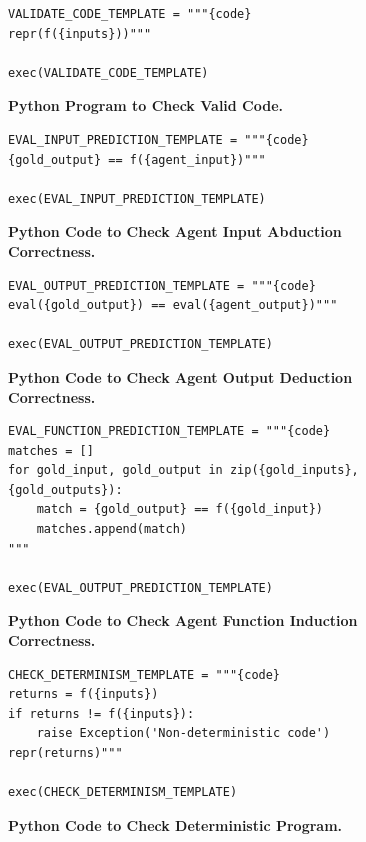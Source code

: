 \documentclass{article}
\begin{document}
\begin{figure}
    \centering
\begin{lstlisting}
VALIDATE_CODE_TEMPLATE = """{code}
repr(f({inputs}))"""

exec(VALIDATE_CODE_TEMPLATE)
    \end{lstlisting}

    \caption{\textbf{Python Program to Check Valid Code.}}
    \label{fig:template_valid_code}
\end{figure}

\begin{figure}
    \centering
\begin{lstlisting}
EVAL_INPUT_PREDICTION_TEMPLATE = """{code}
{gold_output} == f({agent_input})"""

exec(EVAL_INPUT_PREDICTION_TEMPLATE)
    \end{lstlisting}

    \caption{\textbf{Python Code to Check Agent Input Abduction Correctness.}}
    \label{fig:template_correct_input}
\end{figure}

\begin{figure}
    \centering
\begin{lstlisting}
EVAL_OUTPUT_PREDICTION_TEMPLATE = """{code}
eval({gold_output}) == eval({agent_output})"""

exec(EVAL_OUTPUT_PREDICTION_TEMPLATE)
    \end{lstlisting}

    \caption{\textbf{Python Code to Check Agent Output Deduction Correctness.}}
    \label{fig:template_correct_output}
\end{figure}

\begin{figure}
    \centering
\begin{lstlisting}
EVAL_FUNCTION_PREDICTION_TEMPLATE = """{code}
matches = []
for gold_input, gold_output in zip({gold_inputs}, {gold_outputs}):
    match = {gold_output} == f({gold_input})
    matches.append(match)
"""

exec(EVAL_OUTPUT_PREDICTION_TEMPLATE)
    \end{lstlisting}

    \caption{\textbf{Python Code to Check Agent Function Induction Correctness.}}
    \label{fig:template_correct_function}
\end{figure}

\begin{figure}
    \centering
\begin{lstlisting}
CHECK_DETERMINISM_TEMPLATE = """{code}
returns = f({inputs})
if returns != f({inputs}):
    raise Exception('Non-deterministic code')
repr(returns)"""

exec(CHECK_DETERMINISM_TEMPLATE)
    \end{lstlisting}

    \caption{\textbf{Python Code to Check Deterministic Program.}}
    \label{fig:template_deterministic}
\end{figure}
\end{document}
